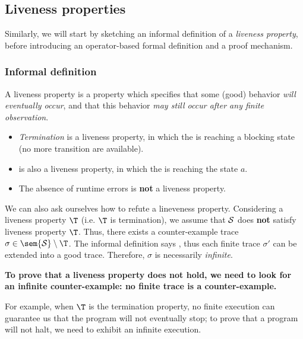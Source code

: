 \documentclass[toc]{../cs-classes/cs-classes}
\begin{document}
\subsection{Liveness properties}
Similarly, we will start by sketching an informal definition of a \emph{liveness property}, before introducing an operator-based formal definition and a proof mechanism.

\subsubsection{Informal definition}
\begin{definition}
    A liveness property is a property which specifies that some (good) behavior \emph{will eventually occur}, and that this behavior \emph{may still occur after any finite observation}.
\end{definition}

\begin{itemize}
    \item \emph{Termination} is a liveness property, in which the  is reaching a blocking state (no more transition are available).
    \item {} is also a liveness property, in which the  is reaching the state $a$.
    \item The absence of runtime errors is \textbf{not} a liveness property.
\end{itemize}

We can also ask ourselves how to refute a lineveness property. Considering a liveness property $\T$ (i.e. $\T$ is termination), we assume that $\mathcal{S}$ does \textbf{not} satisfy liveness property $\T$. Thus, there exists a counter-example trace $\sigma\in\sem{\Sc}\setminus\T$. The informal definition says , thus each finite trace $\sigma'$ can be extended into a good trace. Therefore, $\sigma$ is necessarily \emph{infinite}.
\begin{center}
    \bf To prove that a liveness property does not hold, we need to look for an infinite counter-example: no finite trace is a counter-example.
\end{center}
For example, when $\T$ is the termination property, no finite execution can guarantee us that the program will not eventually stop; to prove that a program will not halt, we need to exhibit an infinite execution.
\end{document}
